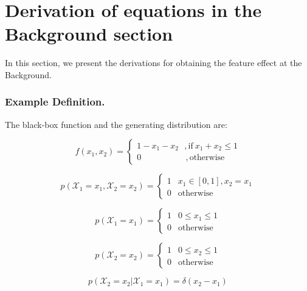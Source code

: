 \documentclass[wcp]{jmlr}
\begin{document}
\section{Derivation of equations in the Background section}

In this section, we present the derivations for obtaining the feature
effect at the Background.


\subsubsection*{Example Definition.}The black-box function and the
generating distribution are:

\begin{equation}
  \label{eq:black-box}
  f(x_1, x_2) =
  \begin{cases}
    1 - x_1 - x_2 \: \: \:  ,\text{if} \: x_1 + x_2  \leq 1 \\
    0 \quad \quad \quad \quad \quad \:, \text{otherwise}
  \end{cases}
\end{equation}

\begin{equation}
  \label{eq:generative}
  p(\mathcal{X}_1 = x_1, \mathcal{X}_2=x_2) =
  \begin{cases}
    1 & x_1 \in [0,1], x_2=x_1 \\
    0 & \text{otherwise}
  \end{cases}
\end{equation}

\begin{equation}
  \label{eq:marginal}
  p(\mathcal{X}_1 = x_1) =
  \begin{cases}
    1 & 0 \leq x_1 \leq 1 \\
    0 & \text{otherwise}
  \end{cases}
\end{equation}

\begin{equation}
  \label{eq:marginal}
  p(\mathcal{X}_2 = x_2) =
  \begin{cases}
    1 & 0 \leq x_2 \leq 1 \\
    0 & \text{otherwise}
  \end{cases}
\end{equation}

\begin{equation}
  \label{eq:marginal}
  p(\mathcal{X}_2 = x_2|\mathcal{X}_1 = x_1) = \delta(x_2-x_1)
\end{equation}
\end{document}

